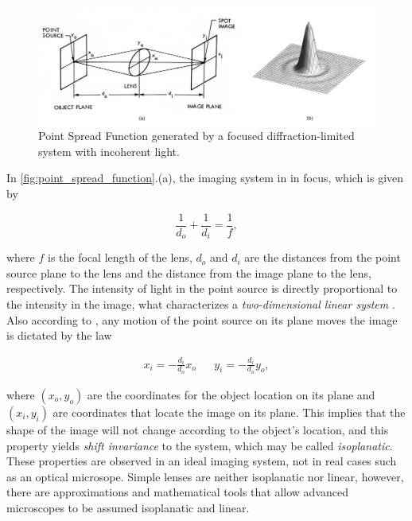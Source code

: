 \begin{figure}[htb]
	\centering
	\caption{\label{fig:point_spread_function} Point Spread Function generated by a focused diffraction-limited system with incoherent light.} 
	\begin{center}
	    \includegraphics[scale=0.235]{images/point_spread_function.jpeg}
	\end{center}
	\centering
\end{figure}

In \autoref{fig:point_spread_function}.(a), the imaging system in in focus, which is given by

\begin{equation}
\label{eqn:lens_focus}
\frac{1}{d_{o}} + \frac{1}{d_{i}} = \frac{1}{f},
\end{equation}

\noindent where $f$ is the focal length of the lens, $d_{o}$ and $d_{i}$ are the distances from the point source plane to the lens and the distance from the image plane to the lens, respectively. The intensity of light in the point source is directly proportional to the intensity in the image, what characterizes a \emph{two-dimensional linear system} \cite{castleman1996digital}. Also according to , any motion of the point source on its plane moves the image is dictated by the law

\begin{align}
\label{eqn:isoplanatic_motion}
x_{i} = -\frac{d_{i}}{d_{o}}x_{o}
&&
y_{i} = -\frac{d_{i}}{d_{o}}y_{o},
\end{align}

\noindent where $(x_{o},y_{o})$ are the coordinates for the object location on its plane and $(x_{i},y_{i})$ are coordinates that locate the image on its plane. This implies that the shape of the image will not change according to the object's location, and this property yields \emph{shift invariance} to the system, which may be called \emph{isoplanatic}. These properties are observed in an ideal imaging system, not in real cases such as an optical microsope. Simple lenses are neither isoplanatic nor linear, however, there are approximations and mathematical tools that allow advanced microscopes to be assumed isoplanatic and linear.

